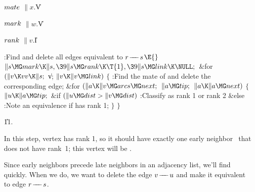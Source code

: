 \Y\B\4\D$\\{mate}$ \5
$\|x.{}$\|V\par
\B\4\D$\\{mark}$ \5
$\|w.{}$\|V\par
\B\4\D$\\{rank}$ \5
$\|v.{}$\|I\par
\Y\B\4:Find and delete all edges equivalent to $r\mathrel{\!\mathrel-\mkern-8mu\mathrel-\mkern-8mu\mathrel-\!} s$\X${}\E{}$\6
$\|s\MG\\{mark}\K\|s,\39\|s\MG\\{rank}\K\T{1},\39\|s\MG\\{link}\K\NULL;{}$\6
\&{for} ${}(\|v\K\\{vv}\K\|s;{}$ \|v; ${}\|v\K\|v\MG\\{link}){}$\5
${}\{{}$\1\6
:Find the mate of  and delete the corresponding edge\X;\6
\&{for} ${}(\|a\K\|v\MG\\{arcs}\MG\\{next};{}$ ${}\|a\MG\\{tip};{}$ ${}\|a\K\|a%
\MG\\{next}){}$\5
${}\{{}$\1\6
${}\|u\K\|a\MG\\{tip};{}$\6
\&{if} ${}(\|u\MG\\{dist}>\|v\MG\\{dist}){}$\1\5
:Classify  as rank 1 or rank 2\X\2\6
\&{else}\1\5
:Note an equivalence if  has rank 1\X;\2\6
\4${}\}{}$\2\6
\4${}\}{}$\2\par
\U11.\fi

In this step, vertex  has rank 1, so it
should have exactly one early neighbor~ that does not
have rank~1; this vertex will be .

Since early neighbors precede
late neighbors in an adjacency list, we'll find  quickly.
When we do, we want to delete the edge $v\mathrel{\!\mathrel-\mkern-8mu\mathrel-\mkern-8mu\mathrel-\!} u$ and make it equivalent to
edge $r\mathrel{\!\mathrel-\mkern-8mu\mathrel-\mkern-8mu\mathrel-\!} s$.

